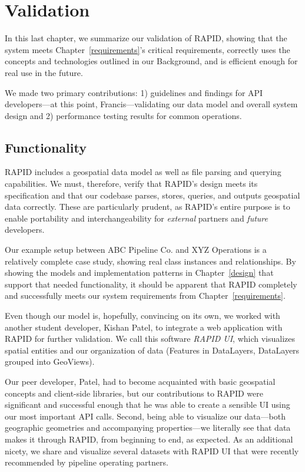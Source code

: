 \chapter{Validation}
\label{validation}
In this last chapter, we summarize our validation of RAPID, showing that the system meets Chapter~\ref{requirements}'s critical requirements, correctly uses the concepts and technologies outlined in our Background, and is efficient enough for real use in the future.

We made two primary contributions: 1) guidelines and findings for API developers---at this point, Francis---validating our data model and overall system design and 2) performance testing results for common operations.

\section{Functionality}
RAPID includes a geospatial data model as well as file parsing and querying capabilities. We must, therefore, verify that RAPID's design meets its specification and that our codebase parses, stores, queries, and outputs geospatial data correctly. These are particularly prudent, as RAPID's entire purpose is to enable portability and interchangeability for \textit{external} partners and \textit{future} developers.

Our example setup between ABC Pipeline Co. and XYZ Operations is a relatively complete case study, showing real class instances and relationships. By showing the models and implementation patterns in Chapter~\ref{design} that support that needed functionality, it should be apparent that RAPID completely and successfully meets our system requirements from Chapter~\ref{requirements}.

Even though our model is, hopefully, convincing on its own, we worked with another student developer, Kishan Patel, to integrate a web application with RAPID for further validation. We call this software \textit{RAPID UI}, which visualizes spatial entities and our organization of data (Features in DataLayers, DataLayers grouped into GeoViews).

Our peer developer, Patel, had to become acquainted with basic geospatial concepts and client-side libraries, but our contributions to RAPID were significant and successful enough that he was able to create a sensible UI using our most important API calls. Second, being able to visualize our data---both geographic geometries and accompanying properties---we literally see that data makes it through RAPID, from beginning to end, as expected. As an additional nicety, we share and visualize several datasets with RAPID UI that were recently recommended by pipeline operating partners.

